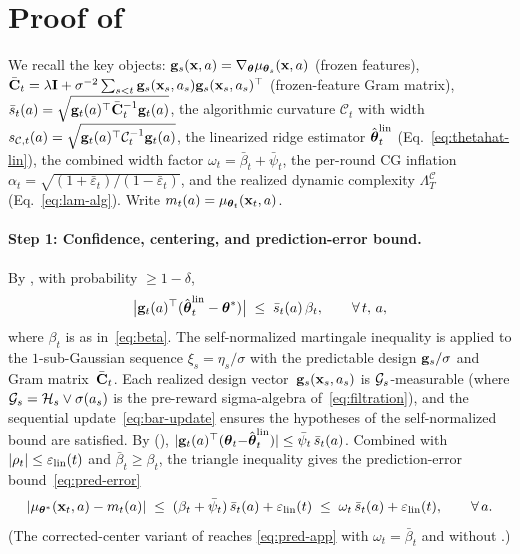 \documentclass[twoside]{article}
\newcommand{\Calg}{\mathcal{C}}                 %
\newcommand{\Lamalg}{\Lambda^{\Calg}}           %
\newcommand{\cHist}{\mathcal{H}}                %
\begin{document}
\section{Proof of \texorpdfstring{}{the main regret theorem}}\label{app:proof}

We recall the key objects:
$\mathbf{g}_s(\mathbf{x},a)=\nabla_{\boldsymbol{\theta}}\mu_{\boldsymbol{\theta}_s}(\mathbf{x},a)$ (frozen features),
$\bar{\mathbf{C}}_t=\lambda\mathbf{I}+\sigma^{-2}\sum_{s<t}\mathbf{g}_s(\mathbf{x}_s,a_s)\mathbf{g}_s(\mathbf{x}_s,a_s)^\top$
(frozen-feature Gram matrix),
$\bar s_t(a)=\sqrt{\mathbf{g}_t(a)^\top\bar{\mathbf{C}}_t^{-1}\mathbf{g}_t(a)}$,
the algorithmic curvature $\Calg_t$ with width
$s_{\Calg,t}(a)=\sqrt{\bg_t(a)^\top\Calg_t^{-1}\bg_t(a)}$,
the linearized ridge estimator $\hat{\boldsymbol{\theta}}_t^{\mathrm{lin}}$
(Eq.~\ref{eq:thetahat-lin}), the combined width factor
$\omega_t=\bar\beta_t+\bar\psi_t$, the per-round CG inflation
$\alpha_t=\sqrt{(1+\bar\varepsilon_t)/(1-\bar\varepsilon_t)}$, and the
realized dynamic complexity $\Lamalg_T$ (Eq.~\ref{eq:lam-alg}).
Write $m_t(a)=\mu_{\boldsymbol{\theta}_t}(\mathbf{x}_t,a)$.

\paragraph{Step 1: Confidence, centering, and prediction-error bound.}
By , with probability $\ge 1-\delta$,
\begin{equation}\label{eq:conf-app}
  \bigl|\mathbf{g}_t(a)^\top(\hat{\boldsymbol{\theta}}_t^{\mathrm{lin}}-\boldsymbol{\theta}^*)\bigr|
  \;\le\; \bar s_t(a)\,\beta_t,
  \qquad\forall\,t,\,a,
\end{equation}
where $\beta_t$ is as in~\eqref{eq:beta}.
The self-normalized martingale inequality
\citep{abbasi2011improved} is applied to the $1$-sub-Gaussian sequence
$\xi_s=\eta_s/\sigma$ with the predictable design $\mathbf{g}_s/\sigma$
and Gram matrix~$\bar{\mathbf{C}}_t$.
Each realized design vector~$\mathbf{g}_s(\mathbf{x}_s,a_s)$ is
$\mathcal{G}_s$-measurable (where $\cG_s=\cHist_s\vee\sigma(a_s)$ is
the pre-reward sigma-algebra of~\eqref{eq:filtration}), and the sequential
update~\eqref{eq:bar-update} ensures the hypotheses
of the self-normalized bound are satisfied.
By  (),
$|\mathbf{g}_t(a)^\top(\boldsymbol{\theta}_t{-}\hat{\boldsymbol{\theta}}_t^{\mathrm{lin}})|\le
\bar\psi_t\,\bar s_t(a)$.
Combined with $|\rho_t|\le\varepsilon_{\mathrm{lin}}(t)$ and $\bar\beta_t\ge\beta_t$, the
triangle inequality gives the prediction-error
bound~\eqref{eq:pred-error}
\begin{equation}\label{eq:pred-app}
  |\mu_{\boldsymbol{\theta}^*}(\mathbf{x}_t,a)-m_t(a)|
  \;\le\;
  (\beta_t+\bar\psi_t)\,\bar s_t(a) + \varepsilon_{\mathrm{lin}}(t)
  \;\le\;
  \omega_t\,\bar s_t(a) + \varepsilon_{\mathrm{lin}}(t),
  \qquad\forall\,a .
\end{equation}
(The corrected-center variant of  reaches
\eqref{eq:pred-app} with $\omega_t=\bar\beta_t$ and without
.)
\end{document}
